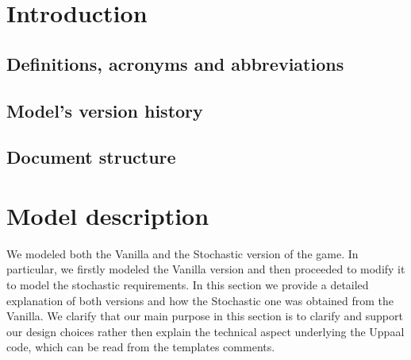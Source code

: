 \documentclass[
10pt, %
a4paper, %
oneside, %
headinclude,footinclude, %
BCOR5mm, %
]{scrartcl}
\begin{document}



\newpage %


\section{Introduction}

	\subsection{Definitions, acronyms and abbreviations}
	\subsection{Model's version history}
	\subsection{Document structure} 

\section{Model description}
We modeled both the Vanilla and the Stochastic version of the game. In particular, we firstly modeled the Vanilla version and then proceeded to modify it to model the stochastic requirements. In this section we provide a detailed explanation of both versions and how the Stochastic one was obtained from the Vanilla. We clarify that our main purpose in this section is to clarify and support our design choices rather then explain the technical aspect underlying the Uppaal code, which can be read from the templates comments.
\end{document}
